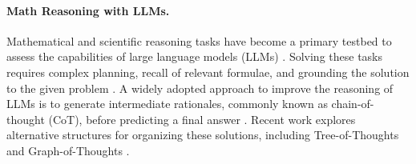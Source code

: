 
\paragraph{Math Reasoning with LLMs.}  
Mathematical and scientific reasoning tasks have become a primary testbed to assess the capabilities of large language models (LLMs) \cite{hendrycks2021measuringmassivemultitasklanguage,arora-etal-2023-llms,wang2024scibench}. Solving these tasks requires complex planning, recall of relevant formulae, and grounding the solution to the given problem \cite{arora-etal-2023-llms}. A widely adopted approach to improve the reasoning of LLMs is to generate intermediate rationales, commonly known as chain-of-thought (CoT), before predicting a final answer \cite{wei2023chainofthoughtpromptingelicitsreasoning}. Recent work explores alternative structures for organizing these solutions, including Tree-of-Thoughts \cite{yao2023treethoughtsdeliberateproblem} and Graph-of-Thoughts \cite{Besta_2024}.

